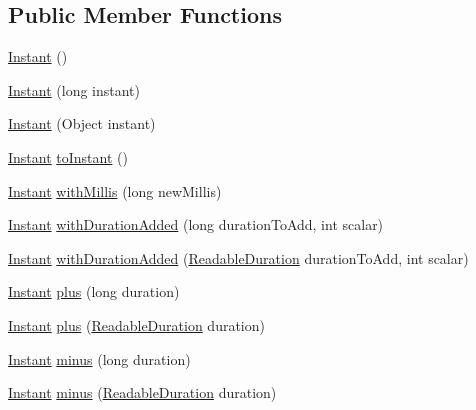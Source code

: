 \subsection*{Public Member Functions}
\begin{DoxyCompactItemize}
\item 
\hyperlink{classorg_1_1joda_1_1time_1_1_instant_a1bcacdb95cfe504acaf4ac0304d666c6}{Instant} ()
\item 
\hyperlink{classorg_1_1joda_1_1time_1_1_instant_abf959cd0c61ae155c8c69e2b17151cbd}{Instant} (long instant)
\item 
\hyperlink{classorg_1_1joda_1_1time_1_1_instant_ae11eab0af00affe9134e2b671c072375}{Instant} (Object instant)
\item 
\hyperlink{classorg_1_1joda_1_1time_1_1_instant}{Instant} \hyperlink{classorg_1_1joda_1_1time_1_1_instant_a236d83cf3c40aebd31ab1da06fa8d93d}{to\-Instant} ()
\item 
\hyperlink{classorg_1_1joda_1_1time_1_1_instant}{Instant} \hyperlink{classorg_1_1joda_1_1time_1_1_instant_a4b843eae917e28b164f4db99d575d1bb}{with\-Millis} (long new\-Millis)
\item 
\hyperlink{classorg_1_1joda_1_1time_1_1_instant}{Instant} \hyperlink{classorg_1_1joda_1_1time_1_1_instant_a8df934888c3bc0d15398f5ed7fd84e0f}{with\-Duration\-Added} (long duration\-To\-Add, int scalar)
\item 
\hyperlink{classorg_1_1joda_1_1time_1_1_instant}{Instant} \hyperlink{classorg_1_1joda_1_1time_1_1_instant_a24ef1981b07acaf5d41b7ba3d0c8b4d5}{with\-Duration\-Added} (\hyperlink{interfaceorg_1_1joda_1_1time_1_1_readable_duration}{Readable\-Duration} duration\-To\-Add, int scalar)
\item 
\hyperlink{classorg_1_1joda_1_1time_1_1_instant}{Instant} \hyperlink{classorg_1_1joda_1_1time_1_1_instant_a7f3e2293a24653362e83c61decc2f992}{plus} (long duration)
\item 
\hyperlink{classorg_1_1joda_1_1time_1_1_instant}{Instant} \hyperlink{classorg_1_1joda_1_1time_1_1_instant_a89f22cc154d6617f54743887c048100b}{plus} (\hyperlink{interfaceorg_1_1joda_1_1time_1_1_readable_duration}{Readable\-Duration} duration)
\item 
\hyperlink{classorg_1_1joda_1_1time_1_1_instant}{Instant} \hyperlink{classorg_1_1joda_1_1time_1_1_instant_a9b07ff82b1f3ed80b31d0446b1ea368f}{minus} (long duration)
\item 
\hyperlink{classorg_1_1joda_1_1time_1_1_instant}{Instant} \hyperlink{classorg_1_1joda_1_1time_1_1_instant_ab151b79cbeb6923818ce5dc573c69e7e}{minus} (\hyperlink{interfaceorg_1_1joda_1_1time_1_1_readable_duration}{Readable\-Duration} duration)

\end{DoxyCompactItemize}
